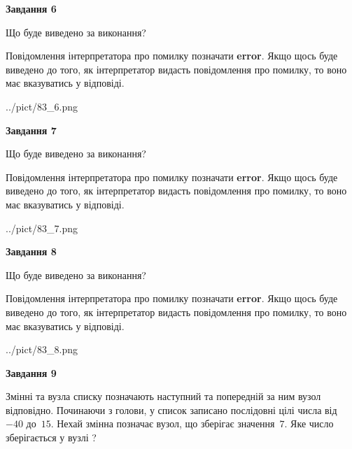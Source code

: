 \documentclass[12pt, ukrainian]{article}
\begin{document}
{\begin {large}
{\begin {center}\textbf{Завдання 6}\end {center}}\par
Що буде виведено за виконання?

Повідомлення інтерпретатора про помилку позначати \textbf{error}.
Якщо щось буде виведено до того, як інтерпретатор видасть повідомлення про помилку, 
то воно має вказуватись у відповіді. \par


\begin{center}
	{../pict/83_6.png}
\end{center}
\newpage

{\begin {center}\textbf{Завдання 7}\end {center}}\par
Що буде виведено за виконання?

Повідомлення інтерпретатора про помилку позначати \textbf{error}.
Якщо щось буде виведено до того, як інтерпретатор видасть повідомлення про помилку, 
то воно має вказуватись у відповіді. \par


\begin{center}
	{../pict/83_7.png}
\end{center}
\newpage

{\begin {center}\textbf{Завдання 8}\end {center}}\par
Що буде виведено за виконання?

Повідомлення інтерпретатора про помилку позначати \textbf{error}.
Якщо щось буде виведено до того, як інтерпретатор видасть повідомлення про помилку, 
то воно має вказуватись у відповіді. \par


\begin{center}
	{../pict/83_8.png}
\end{center}
\newpage

{\begin {center}\textbf{Завдання 9}\end {center}}\par
Змінні  та  вузла списку позначають наступний та попередній за ним вузол відповідно. Починаючи з голови, у список записано послідовні цілі числа від~$-40$ до~$15$. Нехай змінна  позначає вузол, що зберігає значення~$7$.
Яке число зберігається у вузлі  ?\par
\newpage


\end{large}}
\end{document}
